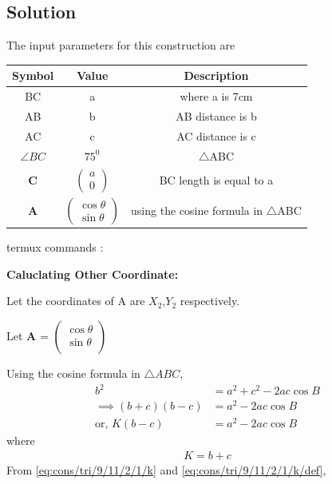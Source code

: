 \documentclass[10pt,a4paper]{report}
\newcommand{\myvec}[1]{\ensuremath{\begin{pmatrix}#1\end{pmatrix}}}
\let\vec\mathbf
\begin{document}
\begin{multicols}{2}
\section{Solution}
The input parameters for this construction are
\begin{center}
\begin{tabular}{|c|c|c|}
	\hline
	\textbf{Symbol}&\textbf{Value}&\textbf{Description}\\
	\hline
	BC & a & where a is 7cm\\
	\hline
	AB & b & AB distance is b \\
	\hline 
	AC & c & AC distance is c \\
	\hline
	$\angle{BC}$ & $75^0$ &  $\triangle$ABC \\
	\hline
	$\vec{C}$ & $\myvec{a\\0}$ & BC length is equal to a\\
	\hline
	$\vec{A}$ & $\myvec{ \cos\theta \\ \sin\theta}$ & using the cosine formula in $\triangle$ABC\\
	\hline
\end{tabular}
\end{center}
\raggedright {termux commands :}
\begin{center}
\end{center}
\raggedright\textbf{Caluclating Other Coordinate: } \\
\raggedright Let the coordinates of A are $X_{2}$,$Y_{2}$ respectively. \\
  \raggedright Let \textbf{A} =
  $\begin{pmatrix} 
 \cos \theta\\
  \sin\theta \\
\end{pmatrix}$ \\
\raggedright 
\fi
	Using the cosine formula in  $\triangle ABC$,
\begin{align}
	{b}^2&= {a}^2 + {c}^2 - 2ac\cos{B}
\\
\implies	(b+c)(b-c) &= {a}^2- 2  a  c\cos{B}
\\
	\text{or, }K(b-c) &= {a}^2- 2  a  c\cos{B}
		\label{eq:cons/tri/9/11/2/1/k}
\end{align}
%
where
\begin{align}
K = b+c 
		\label{eq:cons/tri/9/11/2/1/k/def}
\end{align}
From 
		\eqref{eq:cons/tri/9/11/2/1/k}
		and
		\eqref{eq:cons/tri/9/11/2/1/k/def},
\begin{align}

\end{align}
\end{multicols}
\end{document}
